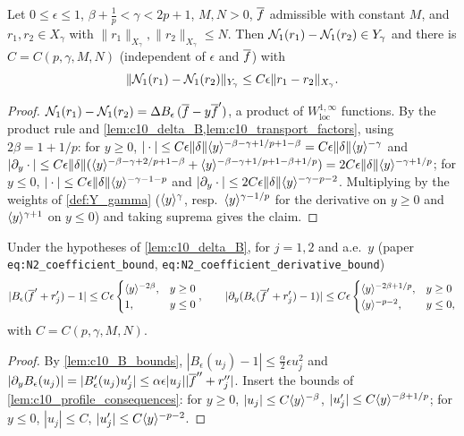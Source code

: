 \begin{lemma}
  \label{lem:N1}
  Let $0\le\epsilon\le1$, $\beta+\frac1p<\gamma<2p+1$, $M,N>0$, $\overline{f}$ admissible with constant $M$, and
  $r_1,r_2\in X_\gamma$ with $\|r_1\|_{X_\gamma},\|r_2\|_{X_\gamma}\le N$. Then
  $\mathcal{N}_1(r_1)-\mathcal{N}_1(r_2)\in Y_\gamma$ and there is $C=C(p,\gamma,M,N)$ (independent of $\epsilon$ and
  $\overline{f}$) with
  \[
    \|\mathcal{N}_1(r_1)-\mathcal{N}_1(r_2)\|_{Y_\gamma}\le C\epsilon\|r_1-r_2\|_{X_\gamma}.
  \]
\end{lemma}
\begin{proof}
  $\mathcal{N}_1(r_1)-\mathcal{N}_1(r_2)=\Delta B_\epsilon\,(\overline{f}-y\overline{f}')$, a product of $W^{1,\infty}_{\mathrm{loc}}$
  functions. By the product rule and \cref{lem:c10_delta_B,lem:c10_transport_factors}, using $2\beta=1+1/p$:
  for $y\ge0$,
  $|\cdot|\le C\epsilon\|\delta\|\langle y \rangle^{-\beta-\gamma+1/p+1-\beta}=C\epsilon\|\delta\|\langle y \rangle^{-\gamma}$ and
  $|\partial_y\cdot|\le C\epsilon\|\delta\|(\langle y \rangle^{-\beta-\gamma+2/p+1-\beta}+\langle y \rangle^{-\beta-\gamma+1/p+1-\beta+1/p})
  =2C\epsilon\|\delta\|\langle y \rangle^{-\gamma+1/p}$;
  for $y\le0$, $|\cdot|\le C\epsilon\|\delta\|\langle y \rangle^{-\gamma-1-p}$ and
  $|\partial_y\cdot|\le 2C\epsilon\|\delta\|\langle y \rangle^{-\gamma-p-2}$. Multiplying by the weights of
  \cref{def:Y_gamma} ($\langle y \rangle^\gamma$, resp.\ $\langle y \rangle^{\gamma-1/p}$ for the derivative on $y\ge0$ and
  $\langle y \rangle^{\gamma+1}$ on $y\le0$) and taking suprema gives the claim.
\end{proof}

\begin{lemma}
  \label{lem:c10_N2_coefficient}
  Under the hypotheses of \cref{lem:c10_delta_B}, for $j=1,2$ and a.e.\ $y$
  (paper \texttt{eq:N2\_coefficient\_bound}, \texttt{eq:N2\_coefficient\_derivative\_bound})
  \[
    |B_\epsilon(\overline{f}'+r_j')-1|\le C\epsilon\begin{cases}\langle y \rangle^{-2\beta},&y\ge0\\1,&y\le0\end{cases},\qquad
    |\partial_y(B_\epsilon(\overline{f}'+r_j')-1)|\le C\epsilon\begin{cases}\langle y \rangle^{-2\beta+1/p},&y\ge0\\\langle y \rangle^{-p-2},&y\le0,\end{cases}
  \]
  with $C=C(p,\gamma,M,N)$.
\end{lemma}
\begin{proof}
  By \cref{lem:c10_B_bounds}, $|B_\epsilon(u_j)-1|\le\frac\alpha2\epsilon u_j^2$ and
  $|\partial_yB_\epsilon(u_j)|=|B_\epsilon'(u_j)u_j'|\le\alpha\epsilon|u_j||\overline{f}''+r_j''|$. Insert the bounds of
  \cref{lem:c10_profile_consequences}: for $y\ge0$, $|u_j|\le C\langle y \rangle^{-\beta}$,
  $|u_j'|\le C\langle y \rangle^{-\beta+1/p}$; for $y\le0$, $|u_j|\le C$, $|u_j'|\le C\langle y \rangle^{-p-2}$.
\end{proof}

